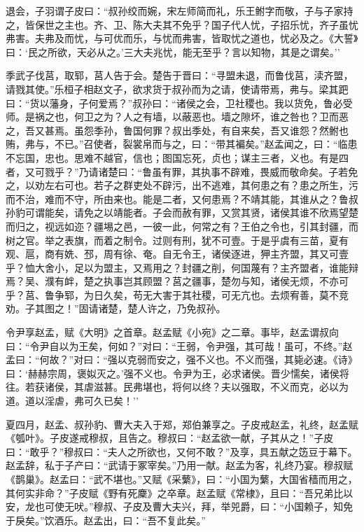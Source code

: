 \documentclass[]{article}
\begin{document}
退会，子羽谓子皮曰：``叔孙绞而婉，宋左师简而礼，乐王鲋字而敬，子与子家持之，皆保世之主也。齐、卫、陈大夫其不免乎？国子代人忧，子招乐忧，齐子虽忧弗害。夫弗及而忧，与可优而乐，与忧而弗害，皆取忧之道也，忧必及之。《大誓》曰：`民之所欲，天必从之。'三大夫兆忧，能无至乎？言以知物，其是之谓矣。''

季武子伐莒，取郓，莒人告于会。楚告于晋曰：``寻盟未退，而鲁伐莒，渎齐盟，请戮其使。''乐桓子相赵文子，欲求货于叔孙而为之请，使请带焉，弗与。梁其跁曰：``货以藩身，子何爱焉？''叔孙曰：``诸侯之会，卫社稷也。我以货免，鲁必受师。是祸之也，何卫之为？人之有墙，以蔽恶也。墙之隙坏，谁之咎也？卫而恶之，吾又甚焉。虽怨季孙，鲁国何罪？叔出季处，有自来矣，吾又谁怨？然鲋也贿，弗与，不已。''召使者，裂裳帛而与之，曰：``带其褊矣。''赵孟闻之，曰：``临患不忘国，忠也。思难不越官，信也；图国忘死，贞也；谋主三者，义也。有是四者，又可戮乎？''乃请诸楚曰：``鲁虽有罪，其执事不辟难，畏威而敬命矣。子若免之，以劝左右可也。若子之群吏处不辟污，出不逃难，其何患之有？患之所生，污而不治，难而不守，所由来也。能是二者，又何患焉？不靖其能，其谁从之？鲁叔孙豹可谓能矣，请免之以靖能者。子会而赦有罪，又赏其贤，诸侯其谁不欣焉望楚而归之，视远如迩？疆埸之邑，一彼一此，何常之有？王伯之令也，引其封疆，而树之官。举之表旗，而着之制令。过则有刑，犹不可壹。于是乎虞有三苗，夏有观、扈，商有姺、邳，周有徐、奄。自无令王，诸侯逐进，狎主齐盟，其又可壹乎？恤大舍小，足以为盟主，又焉用之？封疆之削，何国蔑有？主齐盟者，谁能辩焉？吴、濮有衅，楚之执事岂其顾盟？莒之疆事，楚勿与知，诸侯无烦，不亦可乎？莒、鲁争郓，为日久矣，苟无大害于其社稷，可无亢也。去烦宥善，莫不竞劝。子其图之！''固请诸楚，楚人许之，乃免叔孙。

令尹享赵孟，赋《大明》之首章。赵孟赋《小宛》之二章。事毕，赵孟谓叔向曰：``令尹自以为王矣，何如？''对曰：``王弱，令尹强，其可哉！虽可，不终。''赵孟曰：``何故？''对曰：``强以克弱而安之，强不义也。不义而强，其毙必速。《诗》曰：`赫赫宗周，褒姒灭之。'强不义也。令尹为王，必求诸侯。晋少懦矣，诸侯将往。若获诸侯，其虐滋甚。民弗堪也，将何以终？夫以强取，不义而克，必以为道。道以淫虐，弗可久已矣！''

夏四月，赵孟、叔孙豹、曹大夫入于郑，郑伯兼享之。子皮戒赵孟，礼终，赵孟赋《瓠叶》。子皮遂戒穆叔，且告之。穆叔曰：``赵孟欲一献，子其从之！''子皮曰：``敢乎？''穆叔曰：``夫人之所欲也，又何不敢？''及享，具五献之笾豆于幕下。赵孟辞，私于子产曰：``武请于冢宰矣。''乃用一献。赵孟为客，礼终乃宴。穆叔赋《鹊巢》。赵孟曰：``武不堪也。''又赋《采蘩》，曰：``小国为蘩，大国省穑而用之，其何实非命？''子皮赋《野有死麇》之卒章。赵孟赋《常棣》，且曰：``吾兄弟比以安，龙也可使无吠。''穆叔、子皮及曹大夫兴，拜，举兕爵，曰：``小国赖子，知免于戾矣。''饮酒乐。赵孟出，曰：``吾不复此矣。''
\end{document}

